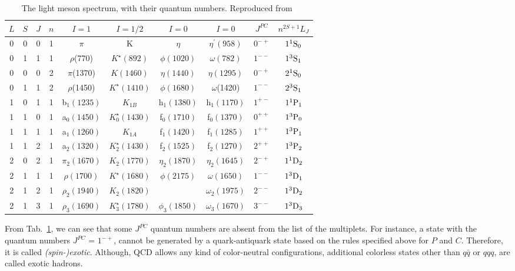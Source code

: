 \begin{table}[H]
    \centering
    \caption{The light meson spectrum, with their quantum numbers. Reproduced from~\cite{Tanabashi18}}
    \label{tab.1.1}
    \begin{tabular}{cccccccccc}
        \hline
        $L$\qquad & $S$\qquad & $J$\qquad & $n$\qquad & $I=1$\qquad & $I=1/2$ \qquad & $I=0$\qquad & $I=0$\qquad & $J^{PC}$\qquad & $n^{2S+1}L_J$\qquad \\
        \hline
        0 & 0 & 0 & 1 & $\pi$ & K & $\eta$ & $\eta^{\prime}(958)$ & $0^{-+}$ & $\rm 1^1S_0$ \\
        0 & 1 & 1 & 1 & $\rho$(770) & $K^{\star}(892)$ & $\phi(1020)$ & $\omega(782)$ & $1^{--}$ & $\rm 1^3S_1$ \\
        \hline
        0 & 0 & 0 & 2 & $\pi$(1370) &  $K(1460)$  & $\eta (1440)$  & $\eta (1295)$ & $0^{-+}$ & $\rm 2^1S_0$\\
        0 & 1 & 1 & 2 & $\rho$(1450) & $K^{\star}(1410)$ & $\phi (1680)$ & $\omega$(1420) & $1^{--}$ & $\rm 2^3S_1$\\
        \hline        
        1 & 0 & 1 & 1 & b$_1(1235)$ & $K_{1B}$ & h$_1(1380)$ & h$_1(1170)$ \quad & $1^{+-}$ & $\rm 1^1P_1$\\
        1 & 1 & 0 & 1 & a$_0(1450)$ & $K_{0}^{\star}(1430)$ & f$_0(1710)$ & f$_0(1370)$ & $0^{++}$ & $\rm 1^3P_0$\\
        1 & 1 & 1 & 1 & a$_1(1260)$ & $K_{1A}$ & f$_1(1420)$ & f$_1(1285)$ & $1^{++}$ & $\rm 1^3P_1$\\
        1 & 1 & 2 & 1 & a$_2(1320)$ & $K_{2}^{\star}(1430)$ & f$_2(1525)$ & f$_2(1270)$ & $2^{++}$ & $\rm 1^3P_2$\\
        \hline
        2 & 0 & 2 & 1 & $\pi_2(1670)$ & $K_{2}(1770)$ & $\eta_2(1870)$ & $\eta_2(1645)$ & $2^{-+}$ & $\rm 1^1D_2$\\
        2 & 1 & 1 & 1 & $\rho(1700)$ & $K^{\star}(1680)$ & $\phi(2175)$ & $\omega(1650)$ & $1^{--}$ & $\rm 1^3D_1$\\
        2 & 1 & 2 & 1 & $\rho_2(1940)$ & $K_2(1820)$ &  & $\omega_2(1975)$ & $2^{--}$ & $\rm 1^3D_2$\\
        2 & 1 & 3 & 1 & $\rho_3(1690)$ & $K^{\star}_3(1780)$ & $\phi_3(1850)$ & $\omega_3(1670)$ & $3^{--}$ & $\rm 1^3D_3$\\
        \hline
    \end{tabular}
\end{table}

From Tab.~\ref{tab.1.1}, we can see that some $J^{PC}$ quantum numbers are absent from the list of the multiplets. For instance, a state with the quantum numbers $J^{PC}$ = $1^{-+}$, cannot be generated by a quark-antiquark state based on the rules specified above for $P$ and $C$. Therefore, it is called {\it (spin-)exotic}. Although, QCD allows any kind of color-neutral configurations, additional colorless states other than $q\bar{q}$ or $qqq$, are called exotic hadrons.

